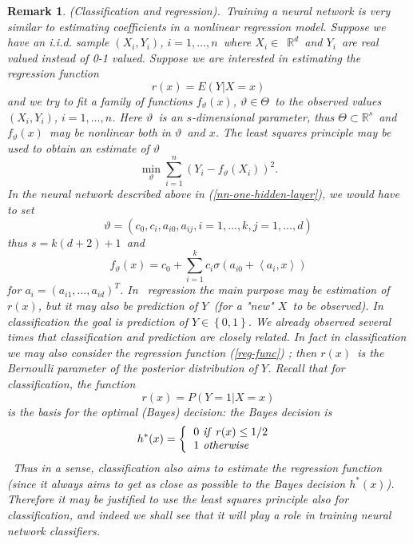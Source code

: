 \documentclass[11pt,twoside]{article}%
\theoremstyle{change}
\newtheorem{remark}[theorem]{Remark}
\begin{document}
\begin{remark}
(Classification and regression).\emph{\ Training a neural network is very
similar to estimating coefficients in a nonlinear regression model. Suppose we
have an i.i.d. sample }$\left(  X_{i},Y_{i}\right)  $\emph{, }$i=1,\ldots,n
$\emph{\ where }$X_{i}\in$\emph{\ }$\mathbb{R}^{d}$\emph{\ and }$Y_{i}%
$\emph{\ are real valued instead of 0-1 valued. Suppose we are interested in
estimating the regression function }%
\begin{equation}
r(x)=E\left(  Y|X=x\right) \label{reg-func}%
\end{equation}
\emph{and we try to fit a family of functions }$f_{\vartheta}(x)$\emph{,
}$\vartheta\in\Theta$\emph{\ to the observed values }$\left(  X_{i}%
,Y_{i}\right)  $\emph{, }$i=1,\ldots,n$\emph{. Here }$\vartheta$\emph{\ is an
}$s$\emph{-dimensional parameter, thus }$\Theta\subset\mathbb{R}^{s}%
$\emph{\ and }$f_{\vartheta}(x)$\emph{\ may be nonlinear both in }$\vartheta
$\emph{\ and }$x$\emph{. The least squares principle may be used to obtain an
estimate of }$\vartheta$\emph{\ }%
\[
\min_{\vartheta}\sum_{i=1}^{n}\left(  Y_{i}-f_{\vartheta}(X_{i})\right)  ^{2}.
\]
\emph{In the neural network described above in (\ref{nn-one-hidden-layer}), we
would have to set }%
\[
\vartheta=\left(  c_{0},c_{i},a_{i0},a_{ij},i=1,\ldots,k,j=1,\ldots,d\right)
\]
\emph{thus }$s=k(d+2)+1$\emph{\ and }%
\[
f_{\vartheta}(x)=c_{0}+\sum_{i=1}^{k}c_{i}\sigma\left(  a_{i0}+\left\langle
a_{i},x\right\rangle \right)
\]
\emph{for }$a_{i}=\left(  a_{i1},\ldots,a_{id}\right)  ^{T}$\emph{. In
\ regression the main purpose may be estimation of }$r(x)$\emph{, but it may
also be prediction of }$Y$\emph{\ (for a "new" }$X$\emph{\ to be observed). In
classification the goal is prediction of }$Y\in\left\{  0,1\right\}  $\emph{.
We already observed several times that classification and prediction are
closely related. In fact in classification we may also consider the regression
function (\ref{reg-func}) ; then }$r(x)$\emph{\ is the Bernoulli parameter of
the posterior distribution of }$Y$\emph{. Recall that for classification, the
function }%
\[
r(x)=P\left(  Y=1|X=x\right)
\]
\emph{is the basis for the optimal (Bayes) decision: the Bayes decision is}%
\[
h^{\ast}(x)=\left\{
\begin{tabular}
[c]{l}%
$0$\emph{\ if }$r(x)\leq1/2$\\
$1$\emph{\ otherwise}%
\end{tabular}
\ \right.
\]
\emph{\ Thus in a sense, classification also aims to estimate the regression
function (since it always aims to get as close as possible to the Bayes
decision }$h^{\ast}(x)$\emph{). Therefore it may be justified to use the least
squares principle also for classification, and indeed we shall see that it
will play a role in training neural network classifiers.}
\end{remark}
\end{document}

